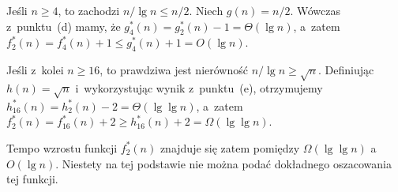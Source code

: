 Jeśli $n\ge4$, to zachodzi $n/\!\lg n\le n/2$. Niech $g(n)=n/2$. Wówczas z~punktu~(d) mamy, że $g_4^*(n)=g_2^*(n)-1=\Theta(\lg n)$, a~zatem $f_2^*(n)=f_4^*(n)+1\le g_4^*(n)+1=O(\lg n)$.

Jeśli z~kolei $n\ge16$, to prawdziwa jest nierówność $n/\!\lg n\ge\sqrt{n}$. Definiując $h(n)=\sqrt{n}$ i~wykorzystując wynik z~punktu~(e), otrzymujemy $h_{16}^*(n)=h_2^*(n)-2=\Theta(\lg\lg n)$, a~zatem $f_2^*(n)=f_{16}^*(n)+2\ge h_{16}^*(n)+2=\Omega(\lg\lg n)$.

Tempo wzrostu funkcji $f_2^*(n)$ znajduje się zatem pomiędzy $\Omega(\lg\lg n)$ a~$O(\lg n)$. Niestety na tej podstawie nie można podać dokładnego oszacowania tej funkcji.

\endinput
